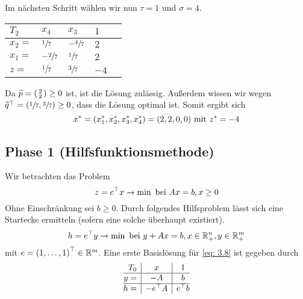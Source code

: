 \begin{beispiel}
	Im nächsten Schritt wählen wir nun $\tau = 1$ und $\sigma = 4$.
	\begin{indentpar}
		\begin{tabular}{R{1.8cm}|R{0.6cm}R{0.6cm}|R{0.6cm} l}
			$T_2$ & \textcolor{cdpurple}{$x_4$} & $x_3$ & $1$ \\ \hline
			$x_2 = $ & $\sfrac{1}{7}$ & $-\sfrac{4}{7}$ & $2$ & \\ 
			\textcolor{cdpurple}{$x_1 = $} & $-\sfrac{2}{7}$ & $\sfrac{1}{7}$ & $2$ \\ \hline
			$z =$ & $\sfrac{1}{7}$ & $\sfrac{3}{7}$  & $-4$ 
		\end{tabular}
	\end{indentpar}
	Da $\schlange{p} = \brackets{\begin{smallmatrix} 2 \\ 2 \end{smallmatrix}} \ge 0$ ist, ist die Lösung zulässig. Außerdem wissen wir wegen $\trans{\schlange{q}} = \brackets{\sfrac{1}{7}, \sfrac{3}{7}} \ge 0$, dass die Lösung optimal ist. Somit ergibt sich
	\begin{equation*}
		x^\ast = (x_1^\ast, x_2^\ast, x_3^\ast, x_4^\ast) = (2,2,0,0) \mit z^\ast = -4
	\end{equation*}
\end{beispiel}

\subsection{Phase 1 (Hilfsfunktionsmethode)}

Wir betrachten das Problem
\begin{equation}
	z = \trans{c} x \to \min \bei Ax = b , x \ge 0
	\label{eq: 3.7}
\end{equation}
Ohne Einschränkung sei $b \ge 0$. Durch folgendes Hilfsproblem lässt sich eine Startecke ermitteln (sofern eine solche überhaupt existiert). 
\begin{equation}
	h = \trans{e} y \to \min \bei y + Ax = b, x \in \Rn_+, y \in \Rm_+
	\label{eq: 3.8}
\end{equation}
mit $e = \transpose{1, \dots , 1} \in \Rm$.
Eine erste Basislösung für \eqref{eq: 3.8} ist gegeben durch 
\begin{equation}
	\begin{array}{@{}r|c|c@{}}
		T_0 & x & 1 \\ \hline
		y =  & -A & b \\ \hline
		h = & -\trans{e}A & \trans{e} b
	\end{array}
	\label{eq: 3.9}
\end{equation}

